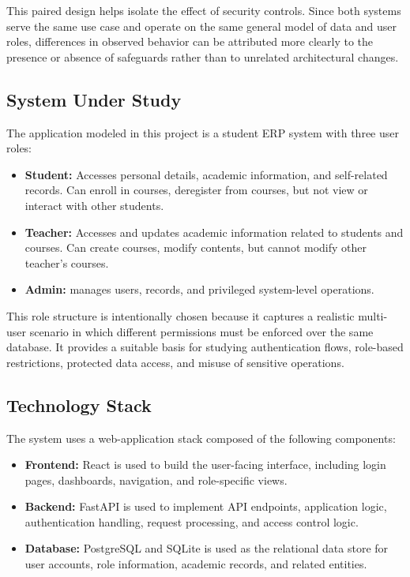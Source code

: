 \documentclass[11pt,a4paper]{article}
\begin{document}
This paired design helps isolate the effect of security controls. Since both systems serve the same use case and operate on the same general model of data and user roles, differences in observed behavior can be attributed more clearly to the presence or absence of safeguards rather than to unrelated architectural changes.

\subsection{System Under Study}

The application modeled in this project is a student ERP system with three user roles:

\begin{itemize}
    \item \textbf{Student:} Accesses personal details, academic information, and self-related records. Can enroll in courses, deregister from courses, but not view or interact with other students.
    \item \textbf{Teacher:} Accesses and updates academic information related to students and courses. Can create courses, modify contents, but cannot modify other teacher's courses.
    \item \textbf{Admin:} manages users, records, and privileged system-level operations.
\end{itemize}

This role structure is intentionally chosen because it captures a realistic multi-user scenario in which different permissions must be enforced over the same database. It provides a suitable basis for studying authentication flows, role-based restrictions, protected data access, and misuse of sensitive operations.

\subsection{Technology Stack}

The system uses a web-application stack composed of the following components:

\begin{itemize}
    \item \textbf{Frontend:} React is used to build the user-facing interface, including login pages, dashboards, navigation, and role-specific views.
    \item \textbf{Backend:} FastAPI is used to implement API endpoints, application logic, authentication handling, request processing, and access control logic.
    \item \textbf{Database:} PostgreSQL and SQLite is used as the relational data store for user accounts, role information, academic records, and related entities.
\end{itemize}
\end{document}
